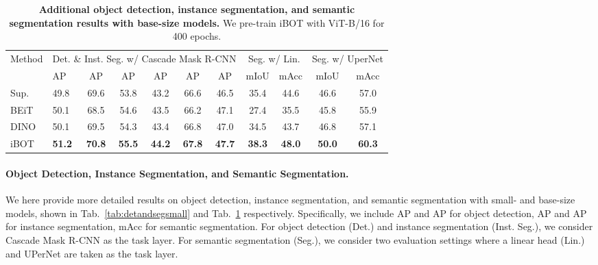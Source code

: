 \documentclass{article} \usepackage{iclr2022_conference,times}
\def\ourmethod{{iBOT}\xspace}
\begin{document}
\begin{table}[!tbp]
\caption{\textbf{Additional object detection, instance segmentation, and semantic segmentation results with base-size models.} We pre-train \ourmethod with ViT-B/16 for 400 epochs.}
\label{tab:detandsegbase}
\centering
\begin{tabular}{llccccccccc}
\multirow{2}{*}{Method} & \multicolumn{6}{c}{Det. \& Inst. Seg. w/ Cascade Mask R-CNN} & \multicolumn{2}{c}{Seg. w/ Lin.} & \multicolumn{2}{c}{Seg. w/ UperNet} \\
\cmidrule(lr){2-7}\cmidrule(lr){8-9}\cmidrule(lr){10-11}
& AP & AP & AP & AP & AP & AP & mIoU & mAcc & mIoU & mAcc \\
\toprule
\textcolor{gray!80}{Sup.} & \textcolor{gray!80}{49.8} & \textcolor{gray!80}{69.6} &  \textcolor{gray!80}{53.8} & \textcolor{gray!80}{43.2} & \textcolor{gray!80}{66.6} & \textcolor{gray!80}{46.5} & \textcolor{gray!80}{35.4} & \textcolor{gray!80}{44.6} & \textcolor{gray!80}{46.6} & \textcolor{gray!80}{57.0} \\
BEiT & 50.1 & 68.5 & 54.6 & 43.5 & 66.2 & 47.1 & 27.4 & 35.5 & 45.8 & 55.9 \\
DINO & 50.1 & 69.5 & 54.3 & 43.4 & 66.8 & 47.0 & 34.5 & 43.7 & 46.8 & 57.1 \\
\rowcolor{cyan!50}
\ourmethod & \bf 51.2 & \bf 70.8 & \bf 55.5 & \bf 44.2 & \bf 67.8 & \bf 47.7 & \bf 38.3 & \bf 48.0 & \bf 50.0 & \bf 60.3 \\
\bottomrule
\end{tabular}
\end{table}

\paragraph{Object Detection, Instance Segmentation, and Semantic Segmentation.} 
We here provide more detailed results on object detection, instance segmentation, and semantic segmentation with small- and base-size models, shown in Tab.~\ref{tab:detandsegsmall} and Tab.~\ref{tab:detandsegbase} respectively. 
Specifically, we include AP and AP for object detection, AP and AP for instance segmentation, mAcc for semantic segmentation.
For object detection (Det.) and instance segmentation (Inst. Seg.), we consider Cascade Mask R-CNN as the task layer. For semantic segmentation (Seg.), we consider two evaluation settings where a linear head (Lin.) and UPerNet are taken as the task layer. 
\end{document}
